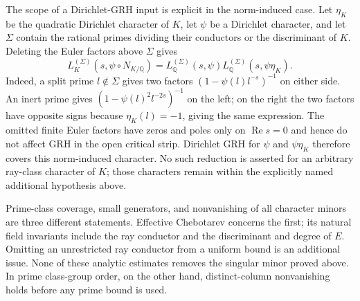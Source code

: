 The scope of a Dirichlet-GRH input is explicit in the norm-induced
case. Let $\eta_K$ be the quadratic Dirichlet character of $K$, let
$\psi$ be a Dirichlet character, and let $\Sigma$ contain the rational
primes dividing their conductors or the discriminant of $K$.
Deleting the Euler factors above $\Sigma$ gives
\[
 L_K^{(\Sigma)}(s,\psi\circ N_{K/\mathbb Q})
 =L_{\mathbb Q}^{(\Sigma)}(s,\psi)
  L_{\mathbb Q}^{(\Sigma)}(s,\psi\eta_K).
\]
Indeed, a split prime $l\notin\Sigma$ gives two factors
$(1-\psi(l)l^{-s})^{-1}$ on either side. An inert prime gives
$(1-\psi(l)^2l^{-2s})^{-1}$ on the left; on the right the two
factors have opposite signs because $\eta_K(l)=-1$, giving the
same expression. The omitted finite Euler factors have zeros and
poles only on $\operatorname{Re}s=0$ and hence do not affect GRH in
the open critical strip. Dirichlet GRH for $\psi$ and $\psi\eta_K$
therefore covers this norm-induced character. No such reduction is
asserted for an arbitrary ray-class character of $K$; those characters
remain within the explicitly named additional hypothesis above.

Prime-class coverage, small generators, and nonvanishing of all
character minors are three different statements. Effective
Chebotarev concerns the first; its natural field invariants include
the ray conductor and the discriminant and degree of $E$.
Omitting an unrestricted ray conductor from a uniform bound is an
additional issue. None of these analytic estimates removes the
singular minor proved above. In prime class-group order, on the other
hand, distinct-column nonvanishing holds before any prime bound is used.
